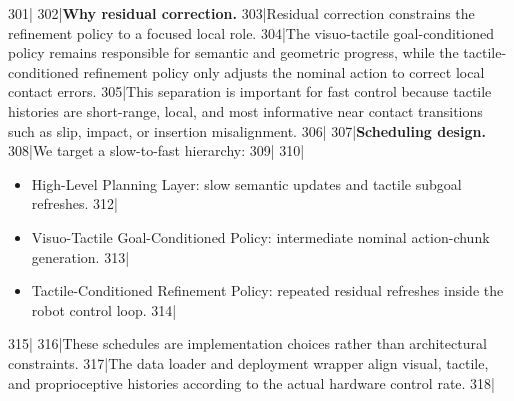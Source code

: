 301|
302|\noindent\textbf{Why residual correction.}
303|Residual correction constrains the refinement policy to a focused local role.
304|The visuo-tactile goal-conditioned policy remains responsible for semantic and geometric progress, while the tactile-conditioned refinement policy only adjusts the nominal action to correct local contact errors.
305|This separation is important for fast control because tactile histories are short-range, local, and most informative near contact transitions such as slip, impact, or insertion misalignment.
306|
307|\noindent\textbf{Scheduling design.}
308|We target a slow-to-fast hierarchy:
309|
310|\begin{itemize}
311|    \item High-Level Planning Layer: slow semantic updates and tactile subgoal refreshes.
312|    \item Visuo-Tactile Goal-Conditioned Policy: intermediate nominal action-chunk generation.
313|    \item Tactile-Conditioned Refinement Policy: repeated residual refreshes inside the robot control loop.
314|\end{itemize}
315|
316|These schedules are implementation choices rather than architectural constraints.
317|The data loader and deployment wrapper align visual, tactile, and proprioceptive histories according to the actual hardware control rate.
318|
